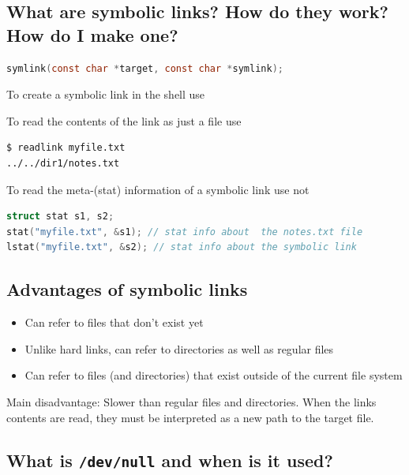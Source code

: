 \subsection{What are symbolic links? How do they work? How do I make one?}\label{what-are-symbolic-links-how-do-they-work-how-do-i-make-one}

\begin{lstlisting}[language=C]
symlink(const char *target, const char *symlink);
\end{lstlisting}

To create a symbolic link in the shell use 

To read the contents of the link as just a file use 

\begin{lstlisting}
$ readlink myfile.txt
../../dir1/notes.txt
\end{lstlisting}

To read the meta-(stat) information of a symbolic link use  not 

\begin{lstlisting}[language=C]
struct stat s1, s2;
stat("myfile.txt", &s1); // stat info about  the notes.txt file
lstat("myfile.txt", &s2); // stat info about the symbolic link
\end{lstlisting}

\subsection{Advantages of symbolic links}\label{advantages-of-symbolic-links}

\begin{itemize}
\tightlist
\item
  Can refer to files that don't exist yet
\item
  Unlike hard links, can refer to directories as well as regular files
\item
  Can refer to files (and directories) that exist outside of the current file system
\end{itemize}

Main disadvantage: Slower than regular files and directories. When the links contents are read, they must be interpreted as a new path to the target file.

\subsection{\texorpdfstring{What is \texttt{/dev/null} and when is it used?}{What is /dev/null and when is it used?}}\label{what-is-devnull-and-when-is-it-used}

